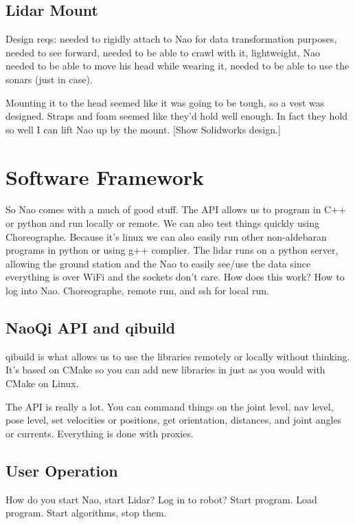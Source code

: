 \subsection{Lidar Mount}
Design reqs: needed to rigidly attach to Nao for data transformation purposes, needed to see forward,
needed to be able to crawl with it, lightweight, Nao needed to be able to move his head while wearing it,
needed to be able to use the sonars (just in case).

Mounting it to the head seemed like it was going to be tough, so a vest was designed.
Straps and foam seemed like they'd hold well enough. In fact they hold so well I can lift Nao up by the mount.
[Show Solidworks design.]

\section{Software Framework}
So Nao comes with a much of good stuff. The API allows us to program in C++ or python and run locally or
remote. We can also test things quickly using Choreographe. Because it's linux we can also easily
run other non-aldebaran programs in python or using g++ complier.
The lidar runs on a python server, allowing the ground station and the Nao to easily see/use the data since
everything is over WiFi and the sockets don't care. How does this work?
How to log into Nao. Choreographe, remote run, and ssh for local run.

\subsection{NaoQi API and qibuild}
qibuild is what allows us to use the libraries remotely or locally without thinking. It's based on CMake
so you can add new libraries in just as you would with CMake on Linux.

The API is really a lot. You can command things on the joint level, nav level, pose level,
set velocities or positions, get orientation, distances, and joint angles or currents.
Everything is done with proxies.

\subsection{User Operation}
How do you start Nao, start Lidar? Log in to robot? Start program. Load program.
Start algorithms, stop them.
			
